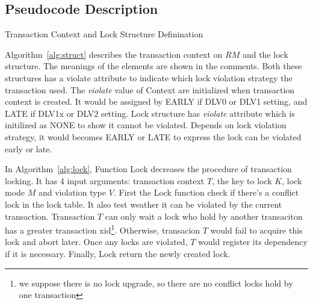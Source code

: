 \documentclass[conference]{IEEEtran}
\begin{document}

\subsection{Pseudocode Description}

\begin{algorithm}
  \caption{Transaction Context and Lock Structure Definination}
  \label{alg:struct}

\end{algorithm}

Algorithm~\ref{alg:struct} describes the transaction context on ${RM}$ and the lock structure.
The meanings of the elements are shown in the comments.
Both these structures has a violate attribute to indicate which lock violation strategy the transaction used.
The \emph{violate} value of Context are initialized when transaction context is created.
It would be assigned by EARLY if DLV0 or DLV1 setting, and LATE if DLV1x or DLV2 setting.
Lock structure has \emph{violate} attribute which is initilized as NONE to show it cannot be violated.
Depends on lock violation strategy, it would becomes EARLY or LATE to express the lock can be violated early or late.

In Algorithm~\ref{alg:lock},  Function Lock decreases the procedure of transaction locking.
It has 4 input arguments: transaction context ${T}$, the key to lock ${K}$, lock mode ${M}$ and violation type ${V}$.
First the Lock function check if there's a conflict lock in the lock table.
It also test weather it can be violated by the current transaction.
Transaction ${T}$ can only wait a lock who hold by another transaciton has a greater transaction xid\footnote{we suppose there is no lock upgrade, so there are no conflict locks hold by one transaction}.
Otherwise, transacion ${T}$ would fail to acquire this lock and abort later.
Once any locks are violated, 
${T}$ would register its dependency if it is necessary. 
Finally, Lock return the newly created lock.
\end{document}
